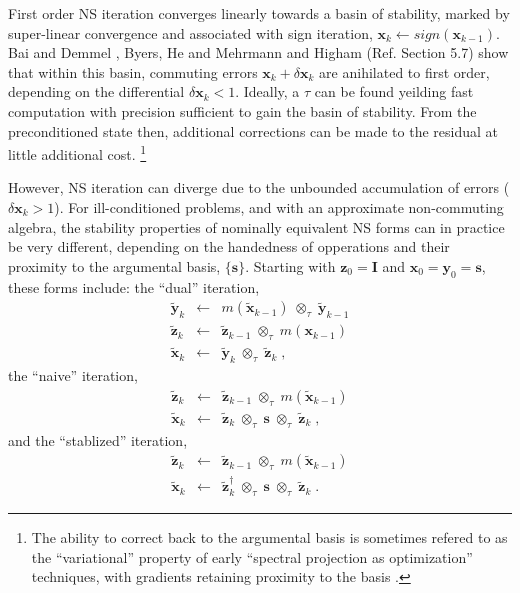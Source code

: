 \documentclass[letterpaper,twocolumn,amsmath,amsfont,amssymb,english,aps,jcp,preprintnumbers,groupaddress,nofootinbib,tightenlines]{revtex4}
\newcommand{\mat}[1]{\boldsymbol{#1}}
\newcommand{\mmat}[1]{\widetilde{\boldsymbol{#1}}}
\newcommand{\ot}{ {\scriptstyle \otimes}_{ \tau } }
\begin{document}
First order NS iteration converges linearly towards a basin of stability, marked by super-linear convergence 
and associated with sign iteration,  $\mat{x}_k \leftarrow sign \left( \mat{x}_{k-1} \right)$. 
Bai and Demmel \cite{}, Byers, He and Mehrmann \cite{} and Higham (Ref.\cite{} Section 5.7)
show that within this basin, commuting errors $\mat{x}_k+\delta \mat{x}_k$ \cite{}  
are anihilated to first order, depending on the differential $\delta \mat{x}_k < 1 $. 
Ideally, a $\tau$ can be found yeilding fast computation with precision sufficient to gain the basin of stability.  From the
preconditioned state then, additional corrections can be made to the residual at little additional 
cost. \footnote{The ability to correct back to the argumental basis is sometimes refered to as 
the ``variational'' property of early ``spectral projection as optimization'' techniques, with 
gradients retaining proximity to the basis \cite{}.}

However, NS iteration can diverge due to the unbounded accumulation of errors ($\delta \mat{x}_k > 1 $).
For ill-conditioned problems, and with an approximate non-commuting algebra, the stability properties of nominally equivalent  NS 
forms can in practice be very different,  depending on the handedness of opperations and their proximity to the 
argumental basis, $\{ \mat{s} \}$.  
Starting with $\mat{z}_0=\mat{I}$ and $\mat{x}_0=\mat{y}_0=\mat{s}$, these forms include: the ``dual'' iteration,
\begin{eqnarray}
\mmat{y}_{k}  &\leftarrow& m \left( \mmat{x}_{k-1} \right) \; \ot \;  \mmat{y}_{k-1}  \\
\mmat{z}_{k}  &\leftarrow& \mmat{z}_{k-1}  \; \ot \;  m \left( \mat{x}_{k-1} \right) \\
\mmat{x}_{k} &\leftarrow& \mmat{y}_{k} \; \ot \; \mmat{z}_{k} \; ,
\end{eqnarray}
the ``naive'' iteration,
\begin{eqnarray}
\mmat{z}_{k}  &\leftarrow& \mmat{z}_{k-1} \; \ot \; m \left( \mmat{x}_{k-1} \right) \\
\mmat{x}_{k} &\leftarrow& \mmat{z}_{k} \; \ot \; \mat{s} \; \ot \; \mmat{z}_{k} \; ,
\end{eqnarray}
and the ``stablized'' iteration,
\begin{eqnarray}
\mmat{z}_{k}  &\leftarrow& \mmat{z}_{k-1}  \; \ot \; m \left( \mmat{x}_{k-1} \right) \\
\mmat{x}_{k} &\leftarrow& \mmat{z}^\dagger_{k} \; \ot \; \mat{s} \; \ot \; \mmat{z}_{k} \; .
\end{eqnarray}
\end{document}
